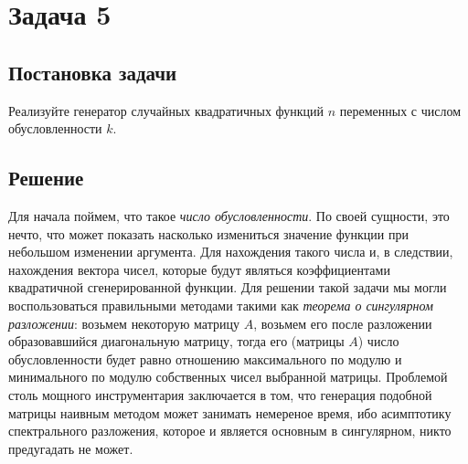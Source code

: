 \documentclass[12pt, a4paper, oneside, final]{article}
\begin{document}
	\newpage
	\section*{Задача 5}
	\subsection*{Постановка задачи}
	Реализуйте генератор случайных квадратичных функций $n$ переменных с числом обусловленности $k$.
	\subsection*{Решение}
	Для начала поймем, что такое \textit{число обусловленности}. По своей сущности, это нечто, что может показать насколько измениться значение функции при небольшом изменении аргумента. Для нахождения такого числа и, в следствии, нахождения вектора чисел, которые будут являться коэффициентами квадратичной сгенерированной функции. Для решении такой задачи мы могли воспользоваться правильными методами такими как \textit{теорема о сингулярном разложении}: возьмем некоторую матрицу $A$, возьмем его после разложении образовавшийся диагональную матрицу, тогда его (матрицы $A$) число обусловленности будет равно отношению максимального по модулю и минимального по модулю собственных чисел выбранной матрицы. Проблемой столь мощного инструментария заключается в том, что генерация подобной матрицы наивным методом может занимать немереное время, ибо асимптотику спектрального разложения, которое и является основным в сингулярном, никто предугадать не может.
\end{document}
